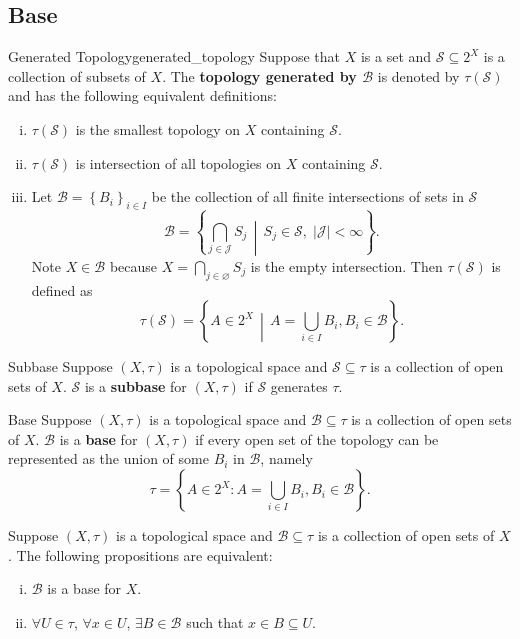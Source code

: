 \documentclass{report}
\newcommand{\midv}{\,\middle\vert\,}
\begin{document}
\subsection{Base}
\begin{definition}{Generated Topology}{generated_topology}
	Suppose that $X$ is a set and $\mathcal{S}\subseteq 2^X$ is a collection of subsets of $X$. The \textbf{topology generated by $\mathcal{B}$} is denoted by $\tau(\mathcal{S})$ and has the following equivalent definitions:
	\begin{enumerate}[(i)]
		\item $\tau(\mathcal{S})$ is the smallest topology on $X$ containing $\mathcal{S}$.
		\item $\tau(\mathcal{S})$ is intersection of all topologies on $X$ containing $\mathcal{S}$.
		\item Let $\mathcal{B}=\left\{B_i\right\}_{i\in I}$ be the collection of all finite intersections of sets in $\mathcal{S}$
		      \[
			      \mathcal{B}= \left\{\bigcap_{j\in \mathcal{J}}S_j\midv S_j \in \mathcal{S},\;|\mathcal{J}|<\infty\right\}.
		      \]
		      Note $X\in \mathcal{B}$ because $X=\bigcap\limits_{j\in \varnothing}S_j$ is the empty intersection. Then $\tau(\mathcal{S})$ is defined as
		      \[
			      \tau(\mathcal{S})=\left\{A\in 2^X \midv A=\bigcup_{i\in I} B_i,B_i\in\mathcal{B}\right\}.
		      \]
	\end{enumerate}
\end{definition}

\begin{definition}{Subbase}{}
	Suppose $(X, \tau)$ is a topological space and $\mathcal{S}\subseteq \tau$ is a collection of open sets of $X$. $\mathcal{S}$ is a \textbf{subbase} for $(X,\tau)$ if $\mathcal{S}$ generates $\tau$.
\end{definition}

\begin{definition}{Base}{}
	Suppose $(X,\tau)$ is a topological space and $\mathcal{B}\subseteq \tau $ is a collection of open sets of $X$. $\mathcal{B}$ is a \textbf{base} for $(X,\tau)$ if every open set of the topology can be represented as the union of some $B_i$ in $\mathcal{B}$, namely
	\[
		\tau=\left\{A\in 2^X:A=\bigcup_{i\in I} B_i,B_i\in\mathcal{B}\right\}.
	\]
\end{definition}

\begin{proposition}{}{}
	Suppose $(X,\tau)$ is a topological space and $\mathcal{B}\subseteq \tau $ is a collection of open sets of $X$. The following propositions are equivalent:
	\begin{enumerate}[(i)]
		\item $\mathcal{B}$ is a base for $X$.
		\item $\forall U\in \tau$, $\forall x\in U$, $\exists B\in\mathcal{B}$ such that $x\in B\subseteq U$.
	\end{enumerate}
\end{proposition}
\end{document}
